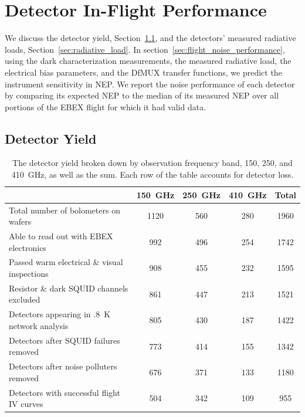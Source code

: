 \chapter{Detector In-Flight Performance}
\label{operation_chapter}

We discuss the detector yield, Section~\ref{sec:yield}, and the detectors' measured radiative loads, Section~\ref{sec:radiative_load}.
In section~\ref{sec:flight_noise_performance}, using the dark characterization measurements, the measured radiative load, the electrical bias parameters, and the \ac{DfMUX} transfer functions, we predict the instrument sensitivity in \ac{NEP}. 
We report the noise performance of each detector by comparing its expected \ac{NEP} to the median of its measured \ac{NEP} over all portions of the \ac{EBEX} flight for which it had valid data. 


\section{Detector Yield}
\label{sec:yield}

\begin{table}[ht!]
\begin{center}
\begin{tabular}{l|c|c|c|c}
  & 150~GHz & 250~GHz & 410~GHz & Total \\
\hline Total number of bolometers on wafers & 1120 & 560 & 280 & 1960 \\
\hline Able to read out with \ac{EBEX} electronics & 992 & 496 & 254 & 1742 \\
\hline Passed warm electrical \& visual inspections & 908 & 455 & 232 & 1595 \\
\hline Resistor \& dark \ac{SQUID} channels excluded & 861 & 447 & 213 & 1521 \\
\hline Detectors appearing in .8~K network analysis & 805 & 430 & 187 & 1422 \\
\hline Detectors after SQUID failures removed & 773 & 414 & 155 & 1342 \\
\hline Detectors after noise polluters removed & 676 & 371 & 133 & 1180 \\
\hline Detectors with successful flight IV curves & 504 & 342 & 109 & 955 \\
\hline
\end{tabular}
\end{center}
\caption[Detector yield]{The detector yield broken down by observation frequency band, 150, 250, and 410~GHz, as well as the sum. Each row of the table accounts for detector loss.}
\label{yield_table}
\end{table}

